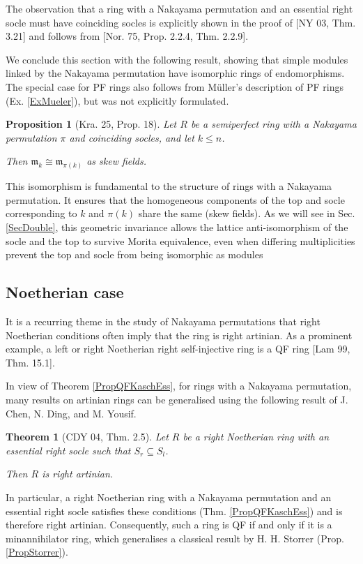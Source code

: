 \documentclass[11pt]{article}
\theoremstyle{plain}
\newtheorem{Thm}[veta]{Theorem}
\newtheorem{Prop}[veta]{Proposition}
\theoremstyle{remark}
\theoremstyle{plain}
\newcommand{\m}{\mathfrak{m}}
\begin{document}
The observation that a ring with a Nakayama permutation and an essential right socle must have coinciding socles is explicitly shown in the proof of [NY 03, Thm. 3.21]  and follows from [Nor. 75, Prop. 2.2.4, Thm. 2.2.9].


We conclude this section with the following result, showing that simple modules linked by the Nakayama permutation have isomorphic rings of endomorphisms.  The special case for PF rings also follows from Müller's description of PF rings (Ex. \ref{ExMueler}), but was not explicitly formulated.
\begin{Prop}[Kra. 25, Prop. 18]\label{PropIsomfields}
    Let $R$ be a semiperfect ring with a Nakayama permutation $\pi$ and coinciding socles, and let $k\leq n$.

    Then $\m_k\cong \m_{\pi(k)}$ as skew fields.
\end{Prop}
This isomorphism is fundamental to the structure of rings with a Nakayama permutation. It ensures that the homogeneous components of the top and socle corresponding to $k$ and $\pi(k)$ share the same  (skew fields). As we will see in Sec. \ref{SecDouble}, this geometric invariance allows the lattice anti-isomorphism of the socle and the top to survive Morita equivalence, even when differing multiplicities prevent the top and socle from being isomorphic as modules

\subsection{Noetherian case}\label{SecDefNoether}

It is a recurring theme in the study of Nakayama permutations that right Noetherian conditions often imply that the ring is right artinian.  As a prominent example, a left or right Noetherian right self-injective ring is a QF ring [Lam 99, Thm. 15.1]. 

In view of Theorem \ref{PropQFKaschEss}, for rings with a Nakayama permutation, many results on artinian rings can be generalised using the following result of J. Chen, N. Ding, and M. Yousif.
\begin{Thm}[CDY 04, Thm. 2.5]
Let $R$ be a right Noetherian ring with an essential right socle such that $S_r\subseteq S_l$.

Then $R$ is right artinian.    
\end{Thm}
In particular, a right Noetherian ring with a Nakayama permutation and an essential right socle satisfies these conditions (Thm. \ref{PropQFKaschEss}) and is therefore right artinian. Consequently, such a ring is QF if and only if it is a minannihilator ring, which generalises a classical result by H. H. Storrer (Prop. \ref{PropStorrer}).
\end{document}
